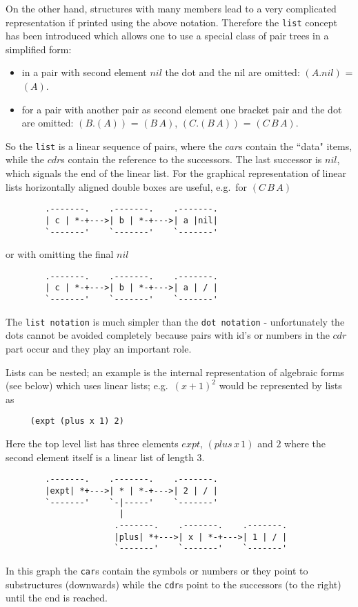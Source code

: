 On the other hand, structures with many members
lead to a very complicated representation if printed using
the above notation. Therefore the {\tt list} concept has been
introduced which allows one to use a special class of pair trees in a 
simplified form:
\begin{itemize}
\item in a pair with second element $nil$ the dot and the nil
 are omitted: $(A.nil)$ = $(A)$.
\item for a pair with another pair as second element  one bracket
 pair and the dot are omitted: $(B.(A))$ = $(B\, A)$, $(C.(B\, A))$ =
  $(C\, B\, A)$.
\end{itemize}

So the {\tt list} is a linear sequence of pairs, where
the $car$s contain the ``data" items, while the $cdr$s contain
the reference to the successors. The last successor is $nil$, which
signals the end of the linear list. 
For the graphical representation of linear lists horizontally
aligned double boxes are useful, e.g.\ for $(C\, B\, A)$
{\nopagebreak[3]
\begin{verbatim}
        .-------.    .-------.    .-------.
        | c | *-+--->| b | *-+--->| a |nil|
        `-------'    `-------'    `-------'
\end{verbatim}
}
or with omitting the final $nil$
{\nopagebreak[3]
\begin{verbatim}
        .-------.    .-------.    .-------.
        | c | *-+--->| b | *-+--->| a | / |
        `-------'    `-------'    `-------'
\end{verbatim}
}
The {\tt list notation}  is
much simpler than the {\tt dot notation} - unfortunately
the dots cannot be avoided completely because pairs with
id's or numbers in the $cdr$ part occur and they play an
important role. 

Lists can be nested; an example is  the internal representation of
algebraic forms (see below) which uses linear lists; e.g.\  
$(x+1)^2$ would be represented by lists as
\begin{verbatim}
     (expt (plus x 1) 2)
\end{verbatim}
Here the top level list has three elements $expt$, $(plus \, x \, 1)$
and $2$ where the second element itself is a linear list of
length 3.
{\nopagebreak[3]
\begin{verbatim}
        .-------.    .-------.    .-------.
        |expt| *+--->| * | *-+--->| 2 | / |
        `-------'    `-|-----'    `-------'
                       |
                      .-------.    .-------.    .-------.
                      |plus| *+--->| x | *-+--->| 1 | / |
                      `-------'    `-------'    `-------'
\end{verbatim}
}
In this graph the {\tt car}s contain the symbols or numbers
or they point to substructures (downwards) while the {\tt cdr}s
point to the successors (to the right) until the end is reached.


